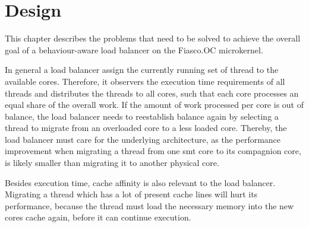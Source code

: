 \chapter{Design}
\label{sec:design}




This chapter describes the problems that need to be solved to achieve the
overall goal of a behaviour-aware load balancer on the Fiasco.OC microkernel.

In general a load balancer assign the currently running set of thread to the
available cores.
Therefore, it observers the execution time requirements of all threads and
distributes the threads to all cores, such that each core processes an equal
share of the overall work.
If the amount of work processed per core is out of balance, the load balancer
needs to reestablish balance again by selecting a thread to migrate from an
overloaded core to a less loaded core.
Thereby, the load balancer must care for the underlying architecture, as
the performance improvement when migrating a thread from one \gls{smt} core to
its compagnion core, is likely smaller than migrating it to another physical core.

Besides execution time, cache affinity is also relevant to the load balancer.
Migrating a thread which has a lot of present cache lines will hurt its
performance, because the thread must load the necessary memory into the new
cores cache again, before it can continue execution.

